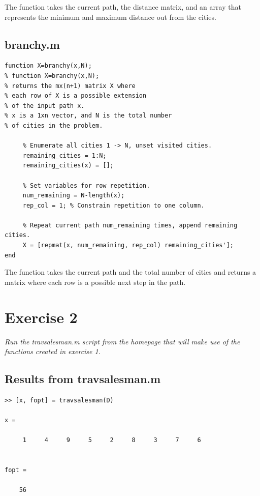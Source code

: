 \documentclass{article}
\begin{document}
  \noindent
  The function takes the current path, the distance matrix, and an array that
  represents the minimum and maximum distance out from the cities.

  \newpage

  \subsection*{branchy.m}

  \begin{lstlisting}
function X=branchy(x,N);
% function X=branchy(x,N);
% returns the mx(n+1) matrix X where
% each row of X is a possible extension
% of the input path x.
% x is a 1xn vector, and N is the total number
% of cities in the problem.

     % Enumerate all cities 1 -> N, unset visited cities.
     remaining_cities = 1:N;
     remaining_cities(x) = [];

     % Set variables for row repetition.
     num_remaining = N-length(x);
     rep_col = 1; % Constrain repetition to one column.

     % Repeat current path num_remaining times, append remaining cities.
     X = [repmat(x, num_remaining, rep_col) remaining_cities'];
end
  \end{lstlisting}

  \noindent
  The function takes the current path and the total number of cities and
  returns a matrix where each row is a possible next step in the path. \\

\section*{Exercise 2}

  \textit{Run the travsalesman.m script from the homepage that will make
  use of the functions created in exercise 1.}

  \subsection*{Results from travsalesman.m}

  \begin{lstlisting}
>> [x, fopt] = travsalesman(D)

x =

     1     4     9     5     2     8     3     7     6


fopt =

    56
  \end{lstlisting}
\end{document}

